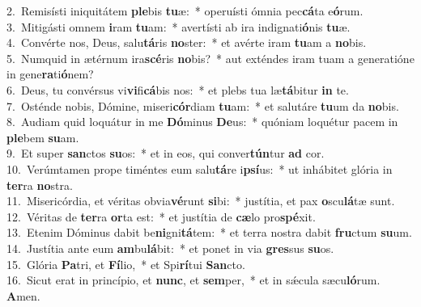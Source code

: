 {2.~}Remisísti iniquitátem \textbf{ple}bis \textbf{tu}æ:~* operuísti ómnia pec\textbf{cá}ta e\textbf{ó}rum.\\
{3.~}Mitigásti omnem \textbf{i}ram \textbf{tu}am:~* avertísti ab ira indignati\textbf{ó}nis \textbf{tu}æ.\\
{4.~}Convérte nos, Deus, salu\textbf{tá}ris \textbf{no}ster:~* et avérte iram \textbf{tu}am a \textbf{no}bis.\\
{5.~}Numquid in ætérnum ira\textbf{scé}ris \textbf{no}bis?~* aut exténdes iram tuam a generatióne in gene\textbf{ra}ti\textbf{ó}nem?\\
{6.~}Deus, tu convérsus vi\textbf{vi}fi\textbf{cá}bis nos:~* et plebs tua læ\textbf{tá}bitur \textbf{in} te.\\
{7.~}Osténde nobis, Dómine, miseri\textbf{cór}diam \textbf{tu}am:~* et salutáre \textbf{tu}um da \textbf{no}bis.\\
{8.~}Audiam quid loquátur in me \textbf{Dó}minus \textbf{De}us:~* quóniam loquétur pacem in \textbf{ple}bem \textbf{su}am.\\
{9.~}Et super \textbf{san}ctos \textbf{su}os:~* et in eos, qui conver\textbf{tún}tur \textbf{ad} cor.\\
{10.~}Verúmtamen prope timéntes eum salu\textbf{tá}re i\textbf{psí}us:~* ut inhábitet glória in \textbf{ter}ra \textbf{no}stra.\\
{11.~}Misericórdia, et véritas obvia\textbf{vé}runt \textbf{si}bi:~* justítia, et pax \textbf{o}scu\textbf{lá}tæ sunt.\\
{12.~}Véritas de \textbf{ter}ra \textbf{or}ta est:~* et justítia de \textbf{cæ}lo pro\textbf{spé}xit.\\
{13.~}Etenim Dóminus dabit be\textbf{ni}gni\textbf{tá}tem:~* et terra nostra dabit \textbf{fru}ctum \textbf{su}um.\\
{14.~}Justítia ante eum \textbf{am}bu\textbf{lá}bit:~* et ponet in via \textbf{gres}sus \textbf{su}os.\\
{15.~}Glória \textbf{Pa}tri, et \textbf{Fí}lio,~* et Spi\textbf{rí}tui \textbf{San}cto.\\
{16.~}Sicut erat in princípio, et \textbf{nunc}, et \textbf{sem}per,~* et in sǽcula sæcu\textbf{ló}rum. \textbf{A}men.\\
